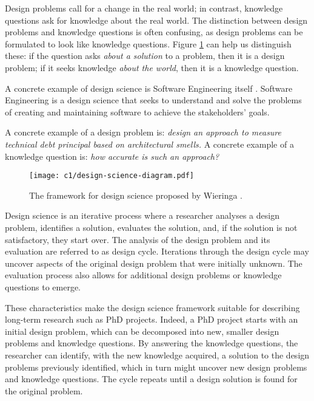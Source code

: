 Design problems call for a change in the real world; in contrast, knowledge questions ask for knowledge about the real world.
The distinction between design problems and knowledge questions is often confusing, as design problems can be formulated to look like knowledge questions.
Figure \ref{fig:design-science} can help us distinguish these: if the question asks  \emph{about a solution} to a problem, then it is a design problem; if it seeks knowledge \emph{about the world}, then it is a knowledge question.

A concrete example of design science is Software Engineering itself \cite{Wieringa2014}.
Software Engineering is a design science that seeks to understand and solve the problems of creating and maintaining software to achieve the stakeholders' goals.

A concrete example of a design problem is: \emph{design an approach to measure technical debt principal based on architectural smells.}
A concrete example of a knowledge question is: \emph{how accurate is such an approach?}

\begin{figure}
    \centering
    \texttt{[image: c1/design-science-diagram.pdf]}
    \caption{The framework for design science proposed by Wieringa \cite{Wieringa2014}.}\label{fig:design-science}
\end{figure}

Design science is an iterative process where a researcher analyses a design problem, identifies a solution, evaluates the solution, and, if the solution is not satisfactory, they start over. 
The analysis of the design problem and its evaluation are referred to as design cycle.
Iterations through the design cycle may uncover aspects of the original design problem that were initially unknown.
The evaluation process also allows for additional design problems or knowledge questions to emerge.

These characteristics make the design science framework suitable for describing long-term research such as PhD projects.
Indeed, a PhD project starts with an initial design problem, which can be decomposed into new, smaller design problems and knowledge questions.
By answering the knowledge questions, the researcher can identify, with the new knowledge acquired, a solution to the design problems previously identified, which in turn might uncover new design problems and knowledge questions.
The cycle repeats until a design solution is found for the original problem.

